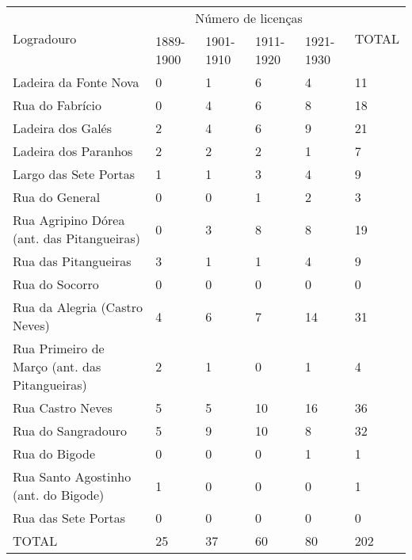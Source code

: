\begin{table}[!htp]
{
\begin{tiny}
\begin{tabular}{llllll}
\toprule
\multirow{2}{*}{Logradouro}	& \multicolumn{4}{c}{Número de licenças}	& \multirow{2}{*}{TOTAL}\\
\cline{2-5}
	&1889-1900	&1901-1910	&1911-1920	&1921-1930	& \\
\midrule
\midrule
Ladeira da Fonte Nova	&0	&1	&6	&4	&11\\
Rua do Fabrício	&0	&4	&6	&8	&18\\
Ladeira dos Galés	&2	&4	&6	&9	&21\\
Ladeira dos Paranhos	&2	&2	&2	&1	&7\\
Largo das Sete Portas	&1	&1	&3	&4	&9\\
Rua do General	&0	&0	&1	&2	&3\\
Rua Agripino Dórea (ant. das Pitangueiras)	&0	&3	&8	&8	&19\\
Rua das Pitangueiras	&3	&1	&1	&4	&9\\
Rua do Socorro	&0	&0	&0	&0	&0\\
Rua da Alegria (Castro Neves)	&4	&6	&7	&14	&31\\
Rua Primeiro de Março (ant. das Pitangueiras)	&2	&1	&0	&1	&4\\
Rua Castro Neves	&5	&5	&10	&16	&36\\
Rua do Sangradouro	&5	&9	&10	&8	&32\\
Rua do Bigode	&0	&0	&0	&1	&1\\
Rua Santo Agostinho (ant. do Bigode)	&1	&0	&0	&0	&1\\
Rua das Sete Portas	&0	&0	&0	&0	&0\\
\midrule
TOTAL	&25	&37	&60	&80	&202\\
\bottomrule
\end{tabular} 
\end{tiny}
}
{ }
\end{table}